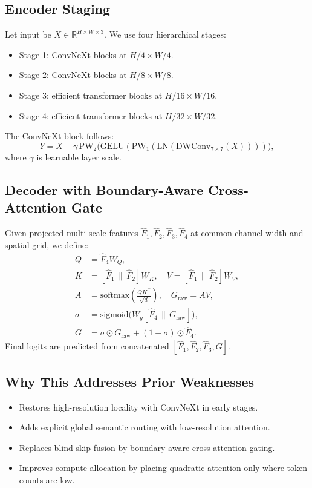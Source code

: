 \documentclass[11pt]{article}
\begin{document}
\subsection{Encoder Staging}
Let input be $X \in \mathbb{R}^{H\times W\times 3}$. We use four hierarchical stages:
\begin{itemize}[leftmargin=1.4em]
    \item Stage 1: ConvNeXt blocks at $H/4 \times W/4$.
    \item Stage 2: ConvNeXt blocks at $H/8 \times W/8$.
    \item Stage 3: efficient transformer blocks at $H/16 \times W/16$.
    \item Stage 4: efficient transformer blocks at $H/32 \times W/32$.
\end{itemize}

The ConvNeXt block follows:
\begin{equation}
Y = X + \gamma\,\mathrm{PW}_2\Big(\mathrm{GELU}(\mathrm{PW}_1(\mathrm{LN}(\mathrm{DWConv}_{7\times7}(X))))\Big),
\end{equation}
where $\gamma$ is learnable layer scale.

\subsection{Decoder with Boundary-Aware Cross-Attention Gate}
Given projected multi-scale features $\hat F_1,\hat F_2,\hat F_3,\hat F_4$ at common channel width and spatial grid, we define:
\begin{align}
Q &= \hat F_4 W_Q, \\
K &= [\hat F_1\,\|\,\hat F_2]W_K,\quad
V = [\hat F_1\,\|\,\hat F_2]W_V, \\
A &= \mathrm{softmax}\left(\frac{QK^\top}{\sqrt{d}}\right),\quad
G_{\text{raw}} = AV, \\
\sigma &= \mathrm{sigmoid}\big(W_g[\hat F_4\,\|\,G_{\text{raw}}]\big), \\
G &= \sigma\odot G_{\text{raw}} + (1-\sigma)\odot\hat F_4.
\end{align}
Final logits are predicted from concatenated $[\hat F_1,\hat F_2,\hat F_3,G]$.

\subsection{Why This Addresses Prior Weaknesses}
\begin{itemize}[leftmargin=1.4em]
    \item Restores high-resolution locality with ConvNeXt in early stages.
    \item Adds explicit global semantic routing with low-resolution attention.
    \item Replaces blind skip fusion by boundary-aware cross-attention gating.
    \item Improves compute allocation by placing quadratic attention only where token counts are low.
\end{itemize}
\end{document}

